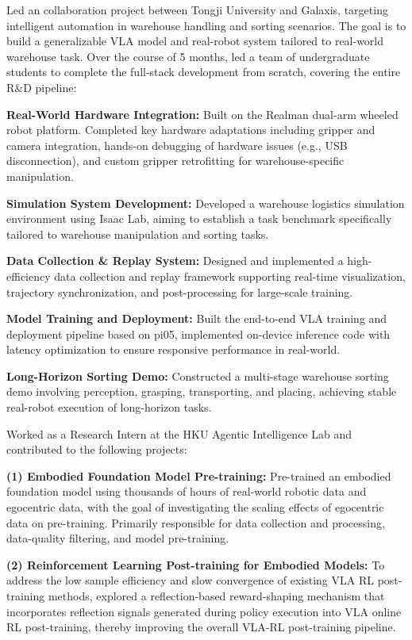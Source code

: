 \documentclass[10pt]{article}
\begin{document}
\newpage
{}
Led an collaboration project between Tongji University and Galaxis, targeting intelligent automation in warehouse handling and sorting scenarios. The goal is to build a generalizable VLA model and real-robot system tailored to real-world warehouse task. Over the course of 5 months, led a team of undergraduate students to complete the full-stack development from scratch, covering the entire R\&D pipeline:
\begin{cvitems}
\item \textbf{Real-World Hardware Integration:} Built on the Realman dual-arm wheeled robot platform. Completed key hardware adaptations including gripper and camera integration, hands-on debugging of hardware issues (e.g., USB disconnection), and custom gripper retrofitting for warehouse-specific manipulation.
\item \textbf{Simulation System Development:} Developed a warehouse logistics simulation environment using Isaac Lab, aiming to establish a task benchmark specifically tailored to warehouse manipulation and sorting tasks.
\item \textbf{Data Collection \& Replay System:} Designed and implemented a high-efficiency data collection and replay framework supporting real-time visualization, trajectory synchronization, and post-processing for large-scale training.
\item \textbf{Model Training and Deployment:} Built the end-to-end VLA training and deployment pipeline based on pi05, implemented on-device inference code with latency optimization to ensure responsive performance in real-world.
\item \textbf{Long-Horizon Sorting Demo:} Constructed a multi-stage warehouse sorting demo involving perception, grasping, transporting, and placing, achieving stable real-robot execution of long-horizon tasks.
\end{cvitems}

\experiencegap
{}
Worked as a Research Intern at the HKU Agentic Intelligence Lab and contributed to the following projects:\par
\textbf{(1) Embodied Foundation Model Pre-training:} Pre-trained an embodied foundation model using thousands of hours of real-world robotic data and egocentric data, with the goal of investigating the scaling effects of egocentric data on pre-training. Primarily responsible for data collection and processing, data-quality filtering, and model pre-training.\par
\textbf{(2) Reinforcement Learning Post-training for Embodied Models:} To address the low sample efficiency and slow convergence of existing VLA RL post-training methods, explored a reflection-based reward-shaping mechanism that incorporates reflection signals generated during policy execution into VLA online RL post-training, thereby improving the overall VLA-RL post-training pipeline.
\end{document}
